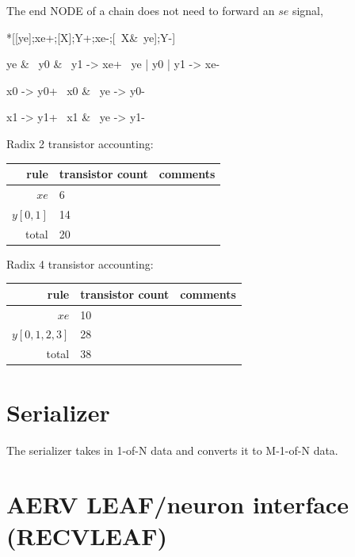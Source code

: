 \documentclass{article}
\begin{document}
\noindent
The end NODE of a chain does not need to forward an $se$ signal,

\begin{hse}
*[[ye];xe+;[X];Y+;xe-;[~X&~ye];Y-]
\end{hse}

\begin{prs2}
ye & ~y0 & ~y1 -> xe+
~ye | y0 | y1 -> xe-
\end{prs2}

\begin{prs2}
x0 -> y0+
~x0 & ~ye -> y0-

x1 -> y1+
~x1 & ~ye -> y1-
\end{prs2}

\noindent
Radix 2 transistor accounting:

\begin{center}
    \begin{tabular}{|r|l|l|}
    \hline
    rule & transistor count & comments \\ \hline
    $xe$ & 6 & \\ \hline
    $y[0,1]$ & 14 & \\ \hline
    \hline total & 20 & \\ \hline
    \end{tabular}
\end{center}

\noindent
Radix 4 transistor accounting:

\begin{center}
    \begin{tabular}{|r|l|l|}
    \hline
    rule & transistor count & comments \\ \hline
    $xe$ & 10 & \\ \hline
    $y[0,1,2,3]$ & 28 & \\ \hline
    \hline total & 38 & \\ \hline
    \end{tabular}
\end{center}


\section{Serializer \label{sec:SERIAL}}

The serializer takes in 1-of-N data and converts it to M-1-of-N data.

\section{AERV LEAF/neuron interface (RECVLEAF) \label{sec:RECV_LEAF}}
\end{document}
